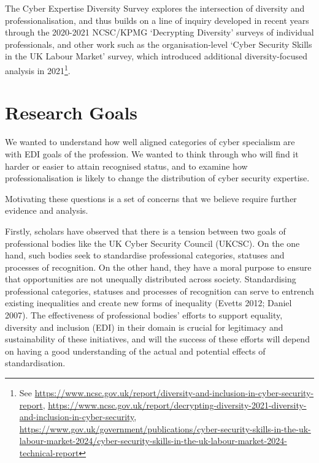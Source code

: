 \documentclass[
  a4paper,
]{book}
\begin{document}
The Cyber Expertise Diversity Survey explores the intersection of
diversity and professionalisation, and thus builds on a line of inquiry
developed in recent years through the 2020-2021 NCSC/KPMG `Decrypting
Diversity' surveys of individual professionals, and other work such as
the organisation-level `Cyber Security Skills in the UK Labour Market'
survey, which introduced additional diversity-focused analysis in
2021\footnote{See
  \url{https://www.ncsc.gov.uk/report/diversity-and-inclusion-in-cyber-security-report},
  \url{https://www.ncsc.gov.uk/report/decrypting-diversity-2021-diversity-and-inclusion-in-cyber-security},
  \href{https://www.gov.uk/government/publications/cyber-security-skills-in-the-uk-labour-market-2024/cyber-security-skills-in-the-uk-labour-market-2024-technical-report\#overview}{https://www.gov.uk/government/publications/cyber-security-skills-in-the-uk-labour-market-2024/cyber-security-skills-in-the-uk-labour-market-2024-technical-report}}.

\section{Research Goals}\label{research-goals}

We wanted to understand how well aligned categories of cyber specialism
are with EDI goals of the profession. We wanted to think through who
will find it harder or easier to attain recognised status, and to
examine how professionalisation is likely to change the distribution of
cyber security expertise.

Motivating these questions is a set of concerns that we believe require
further evidence and analysis.

Firstly, scholars have observed that there is a tension between two
goals of professional bodies like the UK Cyber Security Council (UKCSC).
On the one hand, such bodies seek to standardise professional
categories, statuses and processes of recognition. On the other hand,
they have a moral purpose to ensure that opportunities are not unequally
distributed across society. Standardising professional categories,
statuses and processes of recognition can serve to entrench existing
inequalities and create new forms of inequality (Evetts 2012; Daniel
2007). The effectiveness of professional bodies' efforts to support
equality, diversity and inclusion (EDI) in their domain is crucial for
legitimacy and sustainability of these initiatives, and will the success
of these efforts will depend on having a good understanding of the
actual and potential effects of standardisation.
\end{document}
